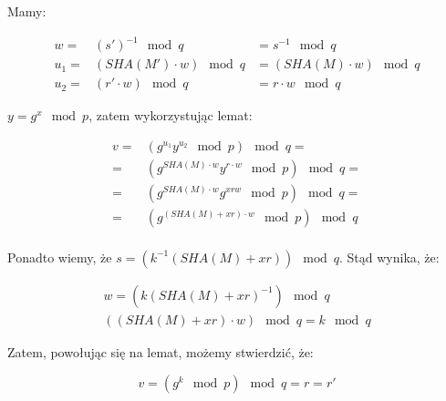 \documentclass{article}
\begin{document}
            Mamy:
            
            \begin{equation*}
                \begin{array}{rcl}
                    w = & (s')^{-1} \mod q & = s^{-1} \mod q \\ 
                    u_{1} = & (SHA(M') \cdot w) \mod q & = (SHA(M) \cdot w) \mod q \\
                    u_{2} = & (r' \cdot w) \mod q & = r \cdot w \mod q
                \end{array}
            \end{equation*}
            
            \noindent $y = g^{x} \mod p$, zatem wykorzystując lemat:
            
            \begin{equation*}
                \begin{array}{rl}
                    v = & (g^{u_{1}} y^{u_{2}} \mod p) \mod q = \\
                    = & (g^{SHA(M) \cdot w} y^{r \cdot w} \mod p) \mod q = \\
                    = & (g^{SHA(M) \cdot w} g^{xrw} \mod p) \mod q = \\
                    = & (g^{(SHA(M) + xr) \cdot w} \mod p) \mod q\\
                \end{array}
            \end{equation*}
            
            Ponadto wiemy, że $s = (k^{-1} (SHA(M) + xr)) \mod q$. Stąd wynika, że:
            
            \begin{equation*}
                \begin{array}{c}
                    w = (k(SHA(M) + xr)^{-1}) \mod q \\
                    ((SHA(M) + xr) \cdot w) \mod q = k \mod q
                \end{array}
            \end{equation*}      
            
            Zatem, powołując się na lemat, możemy stwierdzić, że:
            
            \begin{equation*}
                v = (g^{k} \mod p) \mod q = r = r'
            \end{equation*}
            
\end{document}
